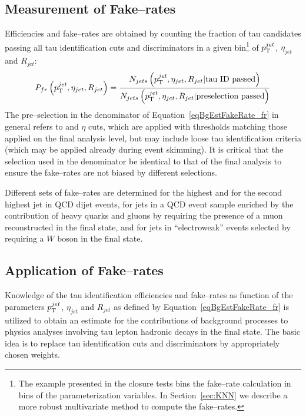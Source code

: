 \subsection{Measurement of Fake--rates}
%
Efficiencies and fake--rates are obtained by counting the fraction of tau
candidates passing all tau identification cuts and discriminators in a given
bin\footnote{The example presented in the closure tests bins the fake--rate
calculation in bins of the parameterization variables.  In Section~\ref{sec:KNN}
we describe a more robust multivariate method to compute the fake--rates.} of
$p_{\mathrm{T}}^{jet}$, $\eta_{jet}$ and $R_{jet}$:
\begin{equation}
P_{fr} \left( p_{\mathrm{T}}^{jet}, \eta_{jet}, R_{jet} \right) = 
  \frac{N_{jets} \left( p_{\mathrm{T}}^{jet}, \eta_{jet}, R_{jet} \vert \mbox{tau ID passed} \right)}
       {N_{jets} \left( p_{\mathrm{T}}^{jet}, \eta_{jet}, R_{jet} \vert \mbox{preselection passed} \right)}
\label{eqBgEstFakeRate_fr}
\end{equation}
The pre--selection in the denominator of Equation~\ref{eqBgEstFakeRate_fr} in
general refers to \pt and $\eta$ cuts, which are applied with thresholds
matching those applied on the final analysis level, but may include
loose tau identification criteria (which may be applied \eg already during event
skimming).  It is critical that the selection used in the denominator be
identical to that of the final analysis to ensure the fake--rates are not biased
by different selections.

Different sets of fake--rates are determined for the highest \pt and for the
second highest \pt jet in QCD dijet events, for jets in a QCD event sample
enriched by the contribution of heavy quarks and gluons by requiring the
presence of a muon reconstructed in the final state, and for jets in
``electroweak'' events selected by requiring a $W$ boson in the final state.

\subsection{Application of Fake--rates}
\label{sec:FakeRateApplication}
%
Knowledge of the tau identification efficiencies and fake--rates as function of
the parameters $p_{\mathrm{T}}^{jet}$, $\eta_{jet}$ and $R_{jet}$ as defined by
Equation~\ref{eqBgEstFakeRate_fr} is utilized to obtain an estimate for the
contributions of background processes to physics analyses involving tau lepton
hadronic decays in the final state.  The basic idea is to replace tau
identification cuts and discriminators by appropriately chosen weights.

